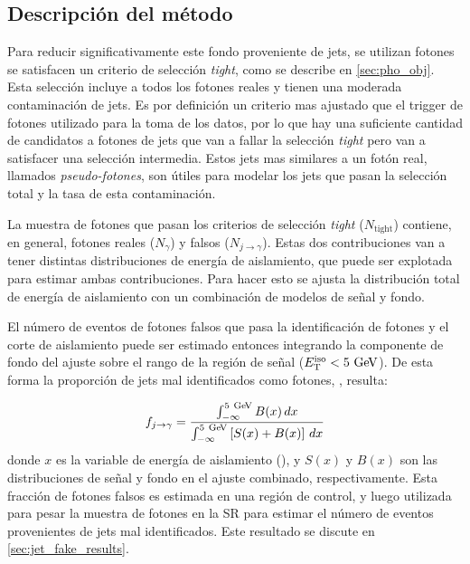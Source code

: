 \subsection{Descripción del método}

Para reducir significativamente este fondo proveniente de jets, se utilizan
fotones se satisfacen un criterio de selección \emph{tight}, como se describe en
\cref{sec:pho_obj}. Esta selección incluye a todos los fotones reales y tienen
una moderada contaminación de jets. Es por definición un criterio mas ajustado
que el trigger de fotones utilizado para la toma de los datos, por lo que hay
una suficiente cantidad de candidatos a fotones de jets que van a fallar la
selección \emph{tight} pero van a satisfacer una selección intermedia. Estos
jets mas similares a un fotón real, llamados \emph{pseudo-fotones}, son útiles
para modelar los jets que pasan la selección total y la tasa de esta
contaminación.


La muestra de fotones que pasan los criterios de selección \emph{tight}
($N_\text{tight}$) contiene, en general, fotones reales ($N_{\gamma}$) y falsos
($N_{j\to\gamma}$). Estas dos contribuciones van a tener distintas
distribuciones de energía de aislamiento, que puede ser explotada para estimar
ambas contribuciones. Para hacer esto se ajusta la distribución total de energía
de aislamiento con un combinación de modelos de señal y fondo.


El número de eventos de fotones falsos que pasa la identificación de fotones y
el corte de aislamiento puede ser estimado entonces integrando la componente de
fondo del ajuste sobre el rango de la región de señal ($\etiso<5\GeV$). De esta
forma la proporción de jets mal identificados como fotones, \fjg, resulta:

\begin{equation}\label{eq:jfake_formula}
  f_{j\to \gamma} = \frac{\int_{-\infty}^{5\gev} B(x)\, dx}{\int_{-\infty}^{5\gev} \left[S(x)+B(x)\right]\, dx}
\end{equation}
%
donde $x$ es la variable de energía de aislamiento (\etiso), y $S(x)$ y $B(x)$
son las distribuciones de señal y fondo en el ajuste combinado, respectivamente.
Esta fracción de fotones falsos es estimada en una región de control, y luego
utilizada para pesar la muestra de fotones en la SR para estimar el número de
eventos provenientes de jets mal identificados. Este resultado se discute en
\cref{sec:jet_fake_results}.



